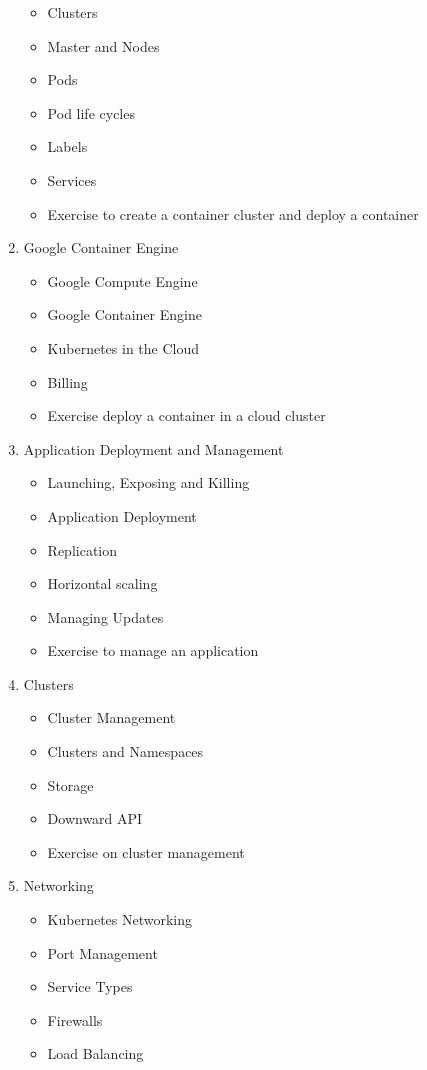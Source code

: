 \documentclass[a4paper,11pt]{article}
\begin{document}
\begin{enumerate}
\begin{itemize}
  \item Clusters
  \item Master and Nodes
  \item Pods
  \item Pod life cycles
  \item Labels
  \item Services
  \item Exercise to create a container cluster and deploy a container
\end{itemize}
\item Google Container Engine
\begin{itemize}
 \item Google Compute Engine
 \item Google Container Engine
 \item Kubernetes in the Cloud
 \item Billing
 \item Exercise deploy a container in a cloud cluster
\end{itemize}
\item Application Deployment and Management
\begin{itemize}
 \item Launching, Exposing and Killing
 \item Application Deployment
 \item Replication
 \item Horizontal scaling
 \item Managing Updates
 \item Exercise to manage an application
\end{itemize}
\item Clusters
\begin{itemize}
  \item Cluster Management
  \item Clusters and Namespaces
  \item Storage
  \item Downward API
  \item Exercise on cluster management
\end{itemize}
\item Networking
\begin{itemize}
  \item Kubernetes Networking
  \item Port Management
  \item Service Types
  \item Firewalls
  \item Load Balancing

\end{itemize}
\end{enumerate}
\end{document}
